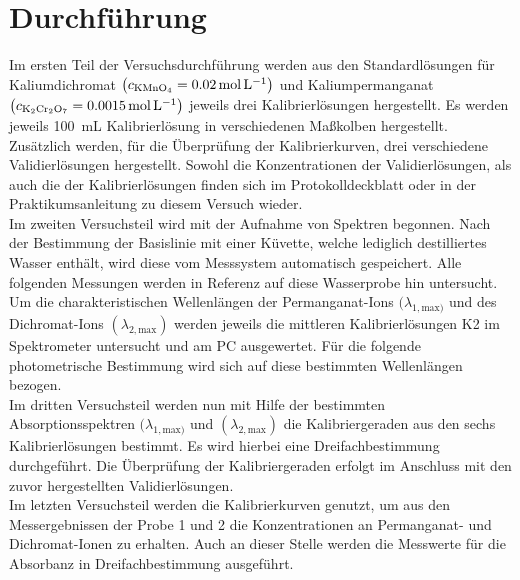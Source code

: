 \newpage
\section{Durchführung}
\label{sec:durchfuerung}
Im ersten Teil der Versuchsdurchführung werden aus den Standardlösungen für Kaliumdichromat $\left(c_\text{\ce{KMnO4}}=\SI{0,02}{\mol \per \liter}\right)$ und Kaliumpermanganat  $\left(c_\text{\ce{K2Cr2O7}}=\SI{0,0015}{\mol \per \liter}\right)$ jeweils drei Kalibrierlösungen hergestellt. Es werden jeweils \SI{100}{\milli \liter} Kalibrierlösung in verschiedenen Maßkolben hergestellt. Zusätzlich werden, für die Überprüfung der Kalibrierkurven, drei verschiedene Validierlösungen hergestellt. Sowohl die Konzentrationen der Validierlösungen, als auch die der Kalibrierlösungen finden sich im Protokolldeckblatt oder in der Praktikumsanleitung zu diesem Versuch wieder.\\
Im zweiten Versuchsteil wird mit der Aufnahme von Spektren begonnen. Nach der Bestimmung der Basislinie mit einer Küvette, welche lediglich destilliertes Wasser enthält, wird diese vom Messsystem automatisch gespeichert. Alle folgenden Messungen werden in Referenz auf diese Wasserprobe hin untersucht. \linebreak
Um die charakteristischen Wellenlängen der Permanganat-Ions $(\lambda_{1,\text{max})}$ und des Dichromat-Ions $(\lambda_{2,\text{max}})$ werden jeweils die mittleren Kalibrierlösungen K2 im Spektrometer untersucht und am PC ausgewertet. Für die folgende photometrische Bestimmung wird sich auf diese bestimmten Wellenlängen bezogen.\\
Im dritten Versuchsteil werden nun mit Hilfe der bestimmten Absorptionsspektren $(\lambda_{1,\text{max})}$ und $(\lambda_{2,\text{max}})$ die Kalibriergeraden aus den sechs Kalibrierlösungen bestimmt. Es wird hierbei eine Dreifachbestimmung durchgeführt. Die Überprüfung der Kalibriergeraden erfolgt im Anschluss mit den zuvor hergestellten Validierlösungen.\\
Im letzten Versuchsteil werden die Kalibrierkurven genutzt, um aus den Messergebnissen der Probe 1 und 2 die Konzentrationen an Permanganat- und Dichromat-Ionen zu erhalten. Auch an dieser Stelle werden die Messwerte für die Absorbanz in Dreifachbestimmung ausgeführt.